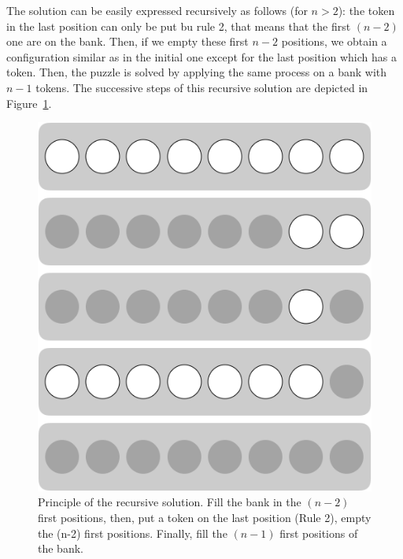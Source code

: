 {The solution can be easily expressed recursively as follows (for $n > 2$):
the token in the last position can only be put bu rule 2, that means that the first $(n-2)$ one are on the bank.
Then, if we empty these first $n-2$ positions,
we obtain a configuration similar as in the initial one except for the last position which has a token. 
Then, the puzzle is solved by applying the same process on a bank with $n-1$ tokens.
The successive steps of this recursive solution are depicted in Figure~\ref{fig:jeujetonsPrinciple}.


\begin{figure}[h]
\begin{center}
        \includegraphics[scale=0.4]{FiguresMaths/GameTokenPrinciple.png}
        \caption{Principle of the recursive solution. Fill the bank in the $(n-2)$ first positions, then, put a token on the last position (Rule 2), 
        empty the (n-2) first positions. Finally, fill the $(n-1)$ first positions of the bank.}
        \label{fig:jeujetonsPrinciple}
\end{center}
\end{figure}
\bigskip

}

